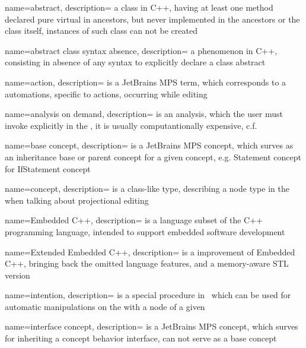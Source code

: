 {
  name=abstract,
  description={ a class in C++, having at least one method declared pure virtual in ancestors, but never implemented in the ancestors or the
  class itself, instances of such class can not be created}
}

{
  name=abstract class syntax absence,
  description={ a phenomenon in C++, consisting in absence of any syntax to explicitly declare a class abstract}
}

{
  name=action,
  description={ is a JetBrains MPS term, which corresponds to a automations, specific to actions, occurring while editing}
}




{
  name=analysis on demand,
  description={ is an analysis, which the user must invoke explicitly in the , it is usually computantionally expensive, c.f.  }
}




{
  name=base concept,
  description={ is a JetBrains MPS concept, which surves as an inheritance base or parent concept for a given concept, e.g. Statement concept for IfStatement concept}
}


{
  name=concept,
  description={ is a class-like type, describing a node type in the  when talking about projectional editing}
}




{
  name=Embedded C++,
  description={ is a language subset of the C++ programming language, intended to
  support embedded software development}
}

{
  name=Extended Embedded C++,
  description={ is a improvement of Embedded C++, bringing back the omitted language features, and a memory-aware STL version}
}


{
  name=intention,
  description={ is a special procedure in \jbmps\ which can be used for automatic manipulations on the  with a node of a given }
}

{
  name=interface concept,
  description={ is a JetBrains MPS concept, which surves for inheriting a concept behavior interface, can not serve as a base concept}
}


